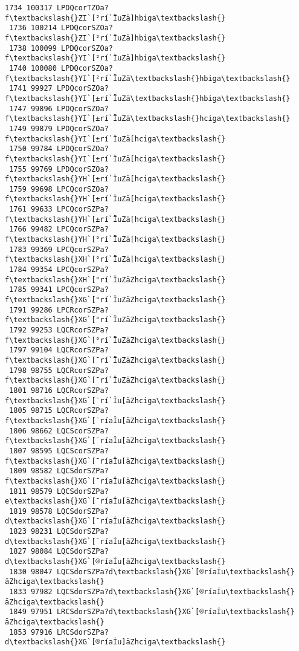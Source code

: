 \documentclass[11pt]{article}
\begin{document}
\begin{Verbatim}[commandchars=\\\{\}]
 1734 100317 LPDQcorTZOa?f\textbackslash{}ZI`[²rí`ÏuZä]hbiga\textbackslash{}
 1736 100214 LPDQcorSZOa?f\textbackslash{}ZI`[²rí`ÏuZä]hbiga\textbackslash{}
 1738 100099 LPDQcorSZOa?f\textbackslash{}YI`[²rí`ÏuZä]hbiga\textbackslash{}
 1740 100080 LPDQcorSZOa?f\textbackslash{}YI`[²rí`ÏuZä\textbackslash{}hbiga\textbackslash{}
 1741 99927 LPDQcorSZOa?f\textbackslash{}YI`[±rí`ÏuZä\textbackslash{}hbiga\textbackslash{}
 1747 99896 LPDQcorSZOa?f\textbackslash{}YI`[±rí`ÏuZä\textbackslash{}hciga\textbackslash{}
 1749 99879 LPDQcorSZOa?f\textbackslash{}YI`[±rí`ÏuZä[hciga\textbackslash{}
 1750 99784 LPDQcorSZOa?f\textbackslash{}YI`[±rí`ÏuZä[hciga\textbackslash{}
 1755 99769 LPDQcorSZOa?f\textbackslash{}YH`[±rí`ÏuZä[hciga\textbackslash{}
 1759 99698 LPCQcorSZOa?f\textbackslash{}YH`[±rí`ÏuZä[hciga\textbackslash{}
 1761 99633 LPCQcorSZPa?f\textbackslash{}YH`[±rí`ÏuZä[hciga\textbackslash{}
 1766 99482 LPCQcorSZPa?f\textbackslash{}YH`[°rí`ÏuZä[hciga\textbackslash{}
 1783 99369 LPCQcorSZPa?f\textbackslash{}XH`[°rí`ÏuZä[hciga\textbackslash{}
 1784 99354 LPCQcorSZPa?f\textbackslash{}XH`[°rí`ÏuZäZhciga\textbackslash{}
 1785 99341 LPCQcorSZPa?f\textbackslash{}XG`[°rí`ÏuZäZhciga\textbackslash{}
 1791 99286 LPCRcorSZPa?f\textbackslash{}XG`[°rí`ÏuZäZhciga\textbackslash{}
 1792 99253 LQCRcorSZPa?f\textbackslash{}XG`[°rí`ÏuZäZhciga\textbackslash{}
 1797 99104 LQCRcorSZPa?f\textbackslash{}XG`[¯rí`ÏuZäZhciga\textbackslash{}
 1798 98755 LQCRcorSZPa?f\textbackslash{}XG`[¯rí`ÎuZäZhciga\textbackslash{}
 1801 98716 LQCRcorSZPa?f\textbackslash{}XG`[¯rí`Îu[äZhciga\textbackslash{}
 1805 98715 LQCRcorSZPa?f\textbackslash{}XG`[¯ríaÎu[äZhciga\textbackslash{}
 1806 98662 LQCScorSZPa?f\textbackslash{}XG`[¯ríaÎu[äZhciga\textbackslash{}
 1807 98595 LQCScorSZPa?f\textbackslash{}XG`[¯ríaÎu[äZhciga\textbackslash{}
 1809 98582 LQCSdorSZPa?f\textbackslash{}XG`[¯ríaÎu[äZhciga\textbackslash{}
 1811 98579 LQCSdorSZPa?e\textbackslash{}XG`[¯ríaÎu[äZhciga\textbackslash{}
 1819 98578 LQCSdorSZPa?d\textbackslash{}XG`[¯ríaÎu[äZhciga\textbackslash{}
 1823 98231 LQCSdorSZPa?d\textbackslash{}XG`[¯ríaÍu[äZhciga\textbackslash{}
 1827 98084 LQCSdorSZPa?d\textbackslash{}XG`[®ríaÍu[äZhciga\textbackslash{}
 1830 98047 LQCSdorSZPa?d\textbackslash{}XG`[®ríaÍu\textbackslash{}äZhciga\textbackslash{}
 1833 97982 LQCSdorSZPa?d\textbackslash{}XG`[®ríaÍu\textbackslash{}äZhciga\textbackslash{}
 1849 97951 LRCSdorSZPa?d\textbackslash{}XG`[®ríaÍu\textbackslash{}äZhciga\textbackslash{}
 1853 97916 LRCSdorSZPa?d\textbackslash{}XG`[®ríaÍu]äZhciga\textbackslash{}

\end{Verbatim}
\end{document}
